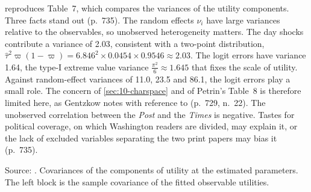   reproduces Table~7, which compares the variances of the utility
components. Three facts stand out (p.~735). The random effects $\nu_i$ have large variances relative to the
observables, so unobserved heterogeneity matters. The day shocks contribute a variance of 2.03, consistent with a
two-point distribution, $\hat\tau^2\varpi(1 - \varpi) = 6.846^2 \times 0.0454 \times 0.9546 \approx 2.03$.
The logit errors have variance 1.64, the type-I extreme value variance $\frac{\pi^2}{6} \approx 1.645$ that fixes the
scale of utility. Against random-effect variances of 11.0, 23.5 and 86.1, the logit errors play a small role. The
concern of \cref{sec:10-charspace} and of Petrin's Table~8 is therefore limited here, as Gentzkow notes with reference
to \citet{Petrin2002} (p.~729, n.~22). The unobserved correlation between the \textit{Post} and the \textit{Times} is
negative. Tastes for political coverage, on which Washington readers are divided, may explain it, or the lack of
excluded variables separating the two print papers may bias it (p.~735).

\begin{table}[htbp]
\centering
\caption{Variances and covariances of the components of utility}\label{tab:10-gentzkow-var}
\small
{}

\smallskip
\begin{minipage}{0.92\textwidth}
\footnotesize Source: \citet[Table~7]{Gentzkow2007}. Covariances of the components of utility at the estimated
parameters. The left block is the sample covariance of the fitted observable utilities.
\end{minipage}
\end{table}

